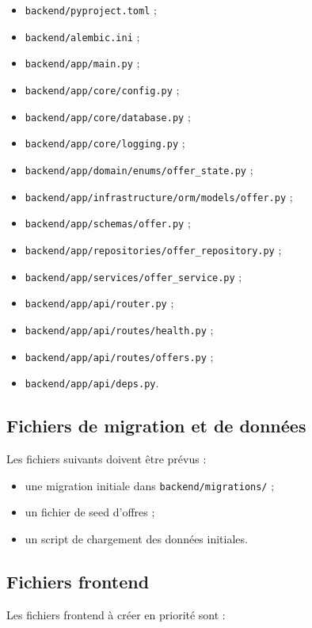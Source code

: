 \documentclass[11pt,a4paper]{article}
\begin{document}
\begin{itemize}
    \item \texttt{backend/pyproject.toml} ;
    \item \texttt{backend/alembic.ini} ;
    \item \texttt{backend/app/main.py} ;
    \item \texttt{backend/app/core/config.py} ;
    \item \texttt{backend/app/core/database.py} ;
    \item \texttt{backend/app/core/logging.py} ;
    \item \texttt{backend/app/domain/enums/offer\_state.py} ;
    \item \texttt{backend/app/infrastructure/orm/models/offer.py} ;
    \item \texttt{backend/app/schemas/offer.py} ;
    \item \texttt{backend/app/repositories/offer\_repository.py} ;
    \item \texttt{backend/app/services/offer\_service.py} ;
    \item \texttt{backend/app/api/router.py} ;
    \item \texttt{backend/app/api/routes/health.py} ;
    \item \texttt{backend/app/api/routes/offers.py} ;
    \item \texttt{backend/app/api/deps.py}.
\end{itemize}

\subsection{Fichiers de migration et de données}

Les fichiers suivants doivent être prévus :

\begin{itemize}
    \item une migration initiale dans \texttt{backend/migrations/} ;
    \item un fichier de seed d’offres ;
    \item un script de chargement des données initiales.
\end{itemize}

\subsection{Fichiers frontend}

Les fichiers frontend à créer en priorité sont :
\end{document}

